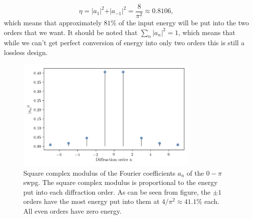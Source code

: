 \begin{equation}
	\eta=\rvert a_1\rvert^2 + \rvert a_{-1}\rvert^2 =\frac{8}{\pi^2}\approx 0.8106,
\end{equation} 
which means that approximately $81\%$ of the input energy will be put into the two orders that we want.  It should be noted that $\sum_{n}\rvert a_n\rvert^2=1$, which means that while we can't get perfect conversion of energy into only two orders this is still a lossless design.
\begin{figure}
	\centering
	\includegraphics[width=0.8\textwidth]{figures/Two_source/a_n.png}
	\caption{Square complex modulus of the Fourier coefficients $a_n$ of the $0-\pi$ \gls{swpg}. The square complex modulus is proportional to the energy put into each diffraction order.  As can be seen from figure, the $\pm1$ orders have the most energy put into them at $4/\pi^2\approx41.1\%$ each.  All even orders have zero energy.}
	\label{fig:a_n}
\end{figure}

